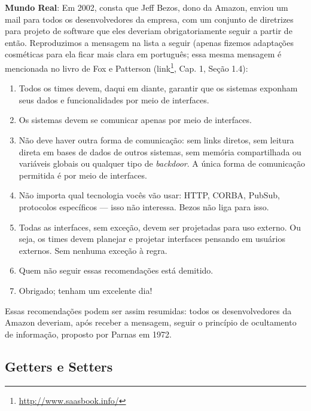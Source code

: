 \documentclass[
  11pt,
  twoside]{book}
\DeclareRobustCommand{\href}[2]{#2\footnote{\url{#1}}}
\newenvironment{esmbox}{\centering \vspace{1.5ex} \begin{tcolorbox}[breakable, colback=backcolor, width=4.9in]}{\end{tcolorbox} \vspace{1.5ex}}
\begin{document}
\begin{esmbox} 

\textbf{Mundo Real}: Em 2002, consta que Jeff Bezos, dono da Amazon,
enviou um mail para todos os desenvolvedores da empresa, com um conjunto
de diretrizes para projeto de software que eles deveriam
obrigatoriamente seguir a partir de então. Reproduzimos a mensagem na
lista a seguir (apenas fizemos adaptações cosméticas para ela ficar mais
clara em português; essa mesma mensagem é mencionada no livro de Fox e
Patterson (\href{http://www.saasbook.info/}{link}, Cap. 1, Seção 1.4):

\begin{enumerate}
\def\labelenumi{\arabic{enumi}.}
\item
  Todos os times devem, daqui em diante, garantir que os sistemas
  exponham seus dados e funcionalidades por meio de interfaces.
\item
  Os sistemas devem se comunicar apenas por meio de interfaces.
\item
  Não deve haver outra forma de comunicação: sem links diretos, sem
  leitura direta em bases de dados de outros sistemas, sem memória
  compartilhada ou variáveis globais ou qualquer tipo de
  \emph{backdoor}. A única forma de comunicação permitida é por meio de
  interfaces.
\item
  Não importa qual tecnologia vocês vão usar: HTTP, CORBA, PubSub,
  protocolos específicos --- isso não interessa. Bezos não liga para
  isso.
\item
  Todas as interfaces, sem exceção, devem ser projetadas para uso
  externo. Ou seja, os times devem planejar e projetar interfaces
  pensando em usuários externos. Sem nenhuma exceção à regra.
\item
  Quem não seguir essas recomendações está demitido.
\item
  Obrigado; tenham um excelente dia!
\end{enumerate}

Essas recomendações podem ser assim resumidas: todos os desenvolvedores da Amazon deveriam, após receber a mensagem, seguir o princípio de ocultamento de informação, proposto por Parnas em 1972.

\end{esmbox} 

\hypertarget{getters-e-setters}{%
\subsection{Getters e Setters}\label{getters-e-setters}}
\end{document}
